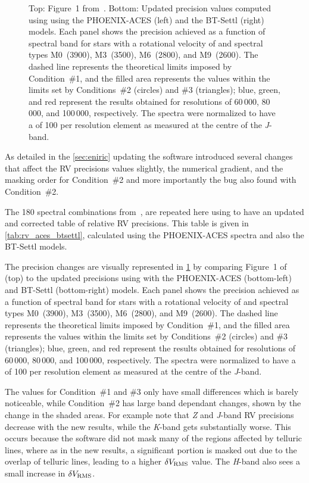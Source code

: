 \begin{figure}
{        Top: Figure~1 from~\citet{figueira_radial_2016}.
        Bottom: Updated precision values computed using \eniric{} using the {PHOENIX-ACES} (left) and the {BT-Settl} (right) models.
        Each panel shows the precision achieved as a function of spectral band for stars with a rotational velocity of \kmps{} and spectral types {M0}~(3900\K), {M3}~(3500\K), {M6}~(2800\K), and {M9}~(2600\K{}).
        The dashed line represents the theoretical limits imposed by Condition~\#1, and the filled area represents the values within the limits set by Conditions~\#2 (circles) and \#3 (triangles); blue, green, and red represent the results obtained for resolutions of 60\,000, 80\,000, and 100\,000, respectively.
        The spectra were normalized to have a \snr{} of 100 per resolution element as measured at the centre of the \emph{J}-band.}
    \label{fig:figueria_comparision}
\end{figure}

As detailed in the \cref{sec:eniric} updating the software introduced several changes that affect the {RV} precisions values slightly, the numerical gradient, and the masking order for Condition~\#2 and more importantly the bug also found with Condition~\#2.

The 180 spectral combinations from~\citet{figueira_radial_2016}, are repeated here using \eniric{} to have an updated and corrected table of relative {RV} precisions.
This table is given in \cref{tab:rv_aces_btsettl}, calculated using the {PHOENIX-ACES} spectra and also the {BT-Settl} models.
 
The precision changes are visually represented in \cref{fig:figueria_comparision} by comparing Figure~1 of~\citet{figueira_radial_2016} (top) to the updated precisions using \eniric{} with the {PHOENIX-ACES} (bottom-left) and {BT-Settl} (bottom-right) models.
Each panel shows the precision achieved as a function of spectral band for stars with a rotational velocity of \kmps{} and spectral types {M0}~(3900\K), {M3}~(3500\K), {M6}~(2800\K), and {M9}~(2600\K).
The dashed line represents the theoretical limits imposed by Condition~\#1, and the filled area represents the values within the limits set by Conditions~\#2 (circles) and \#3 (triangles); blue, green, and red represent the results obtained for resolutions of 60\,000, 80\,000, and 100\,000, respectively.
The spectra were normalized to have a \snr{} of 100 per resolution element as measured at the centre of the \emph{J}-band.

The values for Condition~\#1 and \#3 only have small differences which is barely noticeable, while Condition~\#2 has large band dependant changes, shown by the change in the shaded areas.
For example note that \emph{Z} and \emph{J}-band {RV} precisions decrease with the new results, while the \emph{K}-band gets substantially worse.
This occurs because the software did not mask many of the regions affected by telluric lines, where as in the new results, a significant portion is masked out due to the overlap of telluric lines, leading to a higher \(\delta V_{\textrm{RMS}}\) value.
The \emph{H}-band also sees a small increase in \(\delta V_{\textrm{RMS}}\).

